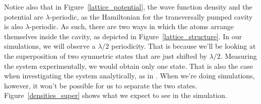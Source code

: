 \noindent Notice also that in Figure~\ref{lattice_potential}, the wave function density and the potential are $\lambda$-periodic, as the Hamiltonian for the transversally pumped cavity is also $\lambda$-periodic. As such, there are two ways in which the atoms arrange themselves inside the cavity, as depicted in Figure~\ref{lattice_structure}. In our simulations, we will observe a $\lambda / 2$ periodicity. That is because we'll be looking at the superposition of two symmetric states that are just shifted by $\lambda / 2$. Measuring the system experimentally, we would obtain only one state. That is also the case when investigating the system analytically, as in \cite{Nagy2008}. When we're doing simulations, however, it won't be possible for us to separate the two states. Figure~\ref{densities_super} shows what we expect to see in the simulation.

